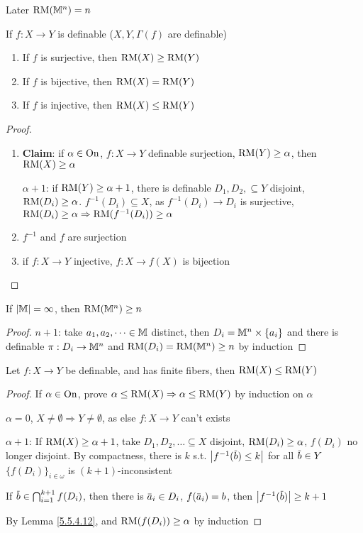 \documentclass[11pt]{article}
\begin{document}
Later \(\operatorname{RM}(\mathbb{M}^n)=n\)

\begin{proposition}[]
If \(f:X\to Y\) is definable (\(X,Y,\Gamma(f)\) are definable)
\begin{enumerate}
\item If \(f\) is surjective, then \(\operatorname{RM}(X)\ge\operatorname{RM}(Y)\)
\item If \(f\) is bijective, then \(\operatorname{RM}(X)=\operatorname{RM}(Y)\)
\item If \(f\) is injective, then \(\operatorname{RM}(X)\le\operatorname{RM}(Y)\)
\end{enumerate}
\end{proposition}

\begin{proof}
\begin{enumerate}
\item \textbf{Claim}: if \(\alpha\in\operatorname{On}\), \(f:X\to Y\) definable surjection, \(\operatorname{RM}(Y)\ge\alpha\), then \(\operatorname{RM}(X)\ge\alpha\)

\(\alpha+1\): if \(\operatorname{RM}(Y)\ge\alpha+1\), there is definable \(D_1,D_2,\subseteq Y\) disjoint, \(\operatorname{RM}(D_i)\ge\alpha\).
\(f^{-1}(D_i)\subseteq X\), as \(f^{-1}(D_i)\to D_i\) is surjective, \(\operatorname{RM}(D_i)\ge\alpha\Rightarrow\operatorname{RM}(f^{-1}(D_i))\ge\alpha\)

\item \(f^{-1}\) and \(f\) are surjection
\item if \(f:X\to Y\) injective, \(f:X\to f(X)\) is bijection
\end{enumerate}
\end{proof}

\begin{examplle}[]
If \(\abs{\M}=\infty\), then \(\operatorname{RM}(\mathbb{M}^n)\ge n\)
\end{examplle}

\begin{proof}
\(n+1\): take \(a_1,a_2,\dots\in\mathbb{M}\) distinct, then \(D_i=\mathbb{M}^n\times\{a_i\}\) and there is definable \(\pi:D_i\to\mathbb{M}^n\)
and \(\operatorname{RM}(D_i)=\operatorname{RM}(\mathbb{M}^n)\ge n\) by induction
\end{proof}

\begin{lemma}[]
\label{5.7.6.7}
Let \(f:X\to Y\) be definable, and has finite fibers, then \(\operatorname{RM}(X)\le\operatorname{RM}(Y)\)
\end{lemma}

\begin{proof}
If \(\alpha\in\operatorname{On}\), prove \(\alpha\le\operatorname{RM}(X)\Rightarrow\alpha\le\operatorname{RM}(Y)\) by induction on \(\alpha\)

\(\alpha=0\), \(X\neq\emptyset\Rightarrow Y\neq\emptyset\), as else \(f:X\to Y\) can't exists

\(\alpha+1\): If \(\operatorname{RM}(X)\ge\alpha+1\), take \(D_1,D_2,\dots\subseteq X\) disjoint, \(\operatorname{RM}(D_i)\ge\alpha\), \(f(D_i)\) no longer
disjoint. By compactness, there is \(k\) s.t. \(\abs{f^{-1}(\barb)\le k}\) for all \(\barb\in Y\)
\(\{f(D_i)\}_{i\in\omega}\) is \((k+1)\)-inconsistent

If \(\barb\in\bigcap_{i=1}^{k+1}f(D_i)\), then there is \(\bara_i\in D_i\), \(f(\bara_i)=b\),
then \(\abs{f^{-1}(\barb)}\ge k+1\)

By Lemma \ref{5.5.4.12}, and \(\operatorname{RM}(f(D_i))\ge\alpha\) by induction
\end{proof}
\end{document}
